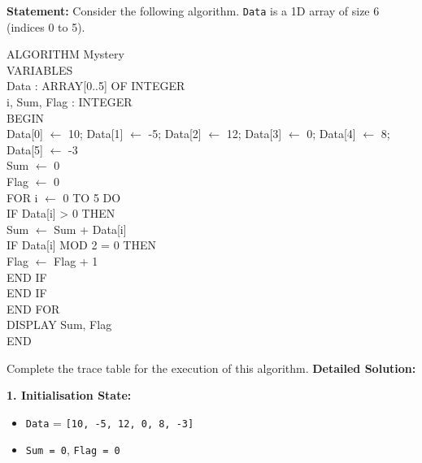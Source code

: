 \documentclass[11pt]{article}
\begin{document}
\begin{exoresolu}
\textbf{Statement:} Consider the following algorithm. \texttt{Data} is a 1D array of size 6 (indices 0 to 5).
\begin{flushleft}
\ttfamily\small
ALGORITHM Mystery\\
VARIABLES\\
\hspace{1em}Data : ARRAY[0..5] OF INTEGER\\
\hspace{1em}i, Sum, Flag : INTEGER\\
BEGIN\\
\hspace{1em}Data[0] $\leftarrow$ 10; Data[1] $\leftarrow$ -5; Data[2] $\leftarrow$ 12; Data[3] $\leftarrow$ 0; Data[4] $\leftarrow$ 8; Data[5] $\leftarrow$ -3\\
\hspace{1em}Sum $\leftarrow$ 0\\
\hspace{1em}Flag $\leftarrow$ 0\\
\hspace{1em}FOR i $\leftarrow$ 0 TO 5 DO\\
\hspace{2em}IF Data[i] > 0 THEN\\
\hspace{3em}Sum $\leftarrow$ Sum + Data[i]\\
\hspace{3em}IF Data[i] MOD 2 = 0 THEN\\
\hspace{4em}Flag $\leftarrow$ Flag + 1\\
\hspace{3em}END IF\\
\hspace{2em}END IF\\
\hspace{1em}END FOR\\
\hspace{1em}DISPLAY Sum, Flag\\
END
\end{flushleft}
Complete the trace table for the execution of this algorithm.
\tcblower
\textbf{Detailed Solution:}

\noindent\textbf{1. Initialisation State:}
\begin{itemize}
    \item \texttt{Data} = \texttt{[10, -5, 12, 0, 8, -3]}
    \item \texttt{Sum = 0}, \texttt{Flag = 0}
\end{itemize}


\end{exoresolu}
\end{document}
